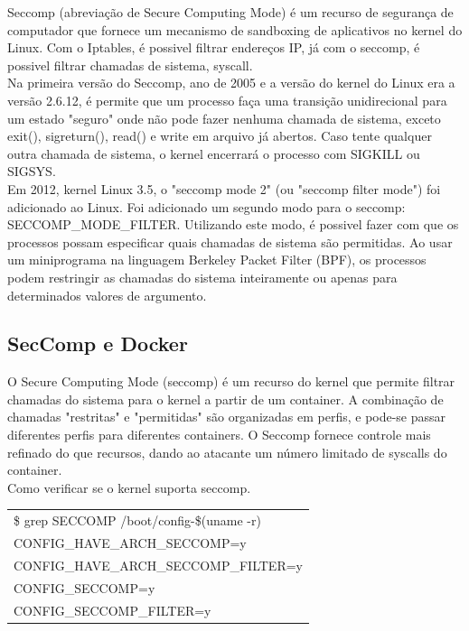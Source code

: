 \documentclass[12pt]{article}
\begin{document}
Seccomp (abreviação de Secure Computing Mode) é um recurso de segurança de computador que fornece um mecanismo de sandboxing de aplicativos no kernel do Linux. Com o Iptables, é possivel filtrar endereços IP, já com o seccomp, é possivel filtrar chamadas de sistema, syscall.\\

Na primeira versão do Seccomp, ano de 2005 e a versão do kernel do Linux era a versão 2.6.12, é permite que um processo faça uma transição unidirecional para um estado "seguro" onde não pode fazer nenhuma chamada de sistema, exceto exit(), sigreturn(), read() e write em arquivo já abertos. Caso tente qualquer outra chamada de sistema, o kernel encerrará o processo com SIGKILL ou SIGSYS.\\

Em 2012, kernel Linux 3.5, o "seccomp mode 2" (ou "seccomp filter mode") foi adicionado ao Linux. Foi adicionado um segundo modo para o seccomp: SECCOMP\_MODE\_FILTER. Utilizando este modo, é possivel fazer com que os processos possam especificar quais chamadas de sistema são permitidas. Ao usar um miniprograma na linguagem Berkeley Packet Filter (BPF), os processos podem restringir as chamadas do sistema inteiramente ou apenas para determinados valores de argumento.\\

\subsection{SecComp e Docker}

O Secure Computing Mode (seccomp) é um recurso do kernel que permite filtrar chamadas do sistema para o kernel a partir de um container. A combinação de chamadas "restritas" e "permitidas" são organizadas em perfis, e pode-se passar diferentes perfis para diferentes containers. O Seccomp fornece controle mais refinado do que recursos, dando ao atacante um número limitado de syscalls do container.\\

Como verificar se o kernel suporta seccomp.\\

\begin{table}[H]
	\begin{tabular}{|l|}
	\hline
	\$ grep SECCOMP /boot/config-\$(uname -r)\\ 
    CONFIG\_HAVE\_ARCH\_SECCOMP=y\\
    CONFIG\_HAVE\_ARCH\_SECCOMP\_FILTER=y\\
    CONFIG\_SECCOMP=y\\
    CONFIG\_SECCOMP\_FILTER=y\\
	\hline
	\end{tabular}
\end{table}
\end{document}
